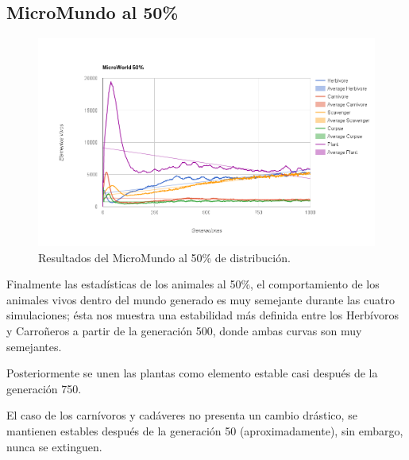     \subsection{MicroMundo al 50\%}      
      \begin{figure}[h!]
        \centering
          \includegraphics[width=\textwidth]{./images/0_5.png}
          \caption{Resultados del MicroMundo al 50\% de distribución.} 
      \end{figure}      
      Finalmente las estadísticas de los animales al 50\%, el comportamiento de los animales vivos dentro del mundo generado es muy semejante durante las cuatro simulaciones; ésta nos muestra una estabilidad más definida entre los Herbívoros y Carroñeros a partir de la generación 500, donde ambas curvas son muy semejantes. 

      Posteriormente se unen las plantas como elemento estable casi después de la generación 750. 

      El caso de los carnívoros y cadáveres no presenta un cambio drástico, se mantienen estables después de la generación 50 (aproximadamente), sin embargo, nunca se extinguen.
    \linebreak
    \newpage
